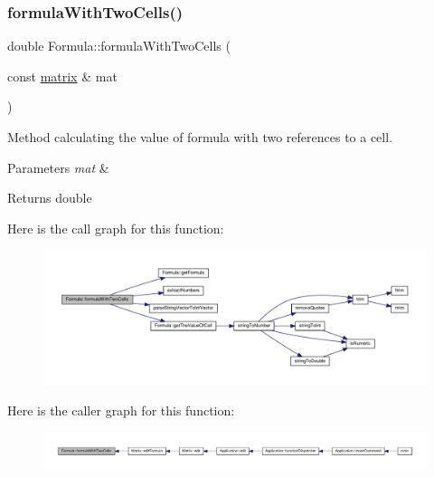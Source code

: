 \subsubsection{\texorpdfstring{formula\+With\+Two\+Cells()}{formulaWithTwoCells()}}
{\footnotesize\ttfamily double Formula\+::formula\+With\+Two\+Cells (\begin{DoxyParamCaption}\item[{const \hyperlink{formula_8h_a869e2a5deeb3daa4c82d6bc91cf20d92}{matrix} \&}]{mat }\end{DoxyParamCaption})}

Method calculating the value of formula with two references to a cell. 
\begin{DoxyParams}{Parameters}
{\em mat} & \\
\hline
\end{DoxyParams}
\begin{DoxyReturn}{Returns}
double 
\end{DoxyReturn}
Here is the call graph for this function\+:\nopagebreak
\begin{figure}[H]
\begin{center}
\leavevmode
\includegraphics[width=350pt]{class_formula_a518bc97bd50f1cc5573be7d3f8cb6253_cgraph}
\end{center}
\end{figure}
Here is the caller graph for this function\+:\nopagebreak
\begin{figure}[H]
\begin{center}
\leavevmode
\includegraphics[width=350pt]{class_formula_a518bc97bd50f1cc5573be7d3f8cb6253_icgraph}
\end{center}
\end{figure}
\mbox{\label{class_formula_a2159ffdb34d80f2bee422eee89fc871a}} 
